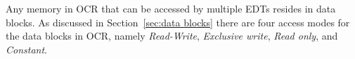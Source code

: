 Any memory in OCR that can be accessed by multiple EDTs resides in data blocks.  As
discussed in Section~\ref{sec:data blocks} there
are four access modes for the data blocks in OCR, namely \emph{Read-Write},
\emph{Exclusive write}, \emph{Read only}, and \emph{Constant}.
\begin{comment}
The modes and how they
interact with the OCR memory model are listed as follows.
\begin{itemize}

\item \emph{Read-Write} (default mode)\index{Data block, read-write}:
  The EDT may read and write to the data block. Multiple EDTs may
  write to the same data block at the same time with values
  constrained according to the rules in the OCR memory model.

\item \emph{Exclusive write}\index{Data block, exclusive write}: The
  EDT requires that it is the only EDT that can commit write
  operations to a data block at a given time. Writes must follow a
  sequential total order; i.e.\ when more than one EDT is writing
  to a data block in exclusive write mode, all the writes from one EDT
  must complete before a subsequent EDT can acquire and then write to
  the data block. This serializes the execution of
  EDTs that acquire a same data block in exclusive write mode.

\item \emph{Read only}\index{Data block, read only}: The EDT
  will only read from the data block. OCR does
  not restrict the ability of other EDTs to write to the data block. The
  visibility of those writes are undefined; i.e.\ an implementation may
  choose whether or not to make writes by other EDTs visible.

\item \emph{Constant}\index{Data Block,constant}: The EDT will
  only read from the data block and the OCR runtime will ensure
  that once the data block is acquired, writes from other EDTs
  will not be visible.

\end{itemize}
\end{comment}

